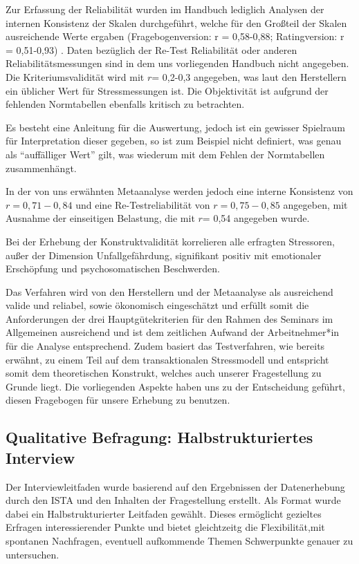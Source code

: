 \documentclass[12pt, a4paper]{article}
\begin{document}
Zur Erfassung der Reliabilität wurden im Handbuch lediglich Analysen der internen
Konsistenz der Skalen durchgeführt, welche für den Großteil der Skalen ausreichende Werte
ergaben (Fragebogenversion: r = 0,58-0,88; Ratingversion: r = 0,51-0,93) 
\parencite{semmerInstrumentZurStressbezogenen1999}. 
Daten bezüglich der Re-Test Reliabilität oder anderen Reliabilitätsmessungen sind in
dem uns vorliegenden Handbuch nicht angegeben. 
Die Kriteriumsvalidität wird mit $r$= 0,2-0,3
angegeben, was laut den Herstellern ein üblicher Wert für Stressmessungen ist.
Die Objektivität ist aufgrund der fehlenden Normtabellen ebenfalls kritisch zu betrachten. 

Es besteht eine Anleitung für die Auswertung, jedoch ist ein gewisser Spielraum für
Interpretation dieser gegeben, so ist zum Beispiel nicht definiert, was genau als “auffälliger
Wert” gilt, was wiederum mit dem Fehlen der Normtabellen zusammenhängt.

In der von uns erwähnten Metaanalyse werden jedoch eine interne Konsistenz von 
$r = 0,71-0,84$ und eine Re-Testreliabilität von $r =0,75-0,85$ angegeben, mit Ausnahme der
einseitigen Belastung, die mit $r$= 0,54 angegeben wurde.

Bei der Erhebung der Konstruktvalidität korrelieren alle erfragten Stressoren, außer der
Dimension Unfallgefährdung, signifikant positiv mit emotionaler Erschöpfung und
psychosomatischen Beschwerden.

Das Verfahren wird von den Herstellern und der Metaanalyse als ausreichend valide und
reliabel, sowie ökonomisch eingeschätzt und erfüllt somit die Anforderungen der drei
Hauptgütekriterien für den Rahmen des Seminars im Allgemeinen ausreichend und ist dem
zeitlichen Aufwand der Arbeitnehmer*in für die Analyse entsprechend. Zudem basiert das
Testverfahren, wie bereits erwähnt, zu einem Teil auf dem transaktionalen Stressmodell und
entspricht somit dem theoretischen Konstrukt, welches auch unserer Fragestellung zu
Grunde liegt. Die vorliegenden Aspekte haben uns zu der Entscheidung geführt, diesen
Fragebogen für unsere Erhebung zu benutzen.

\subsection{Qualitative Befragung: Halbstrukturiertes Interview}

Der Interviewleitfaden wurde basierend auf den Ergebnissen der Datenerhebung durch den 
ISTA und den Inhalten der Fragestellung erstellt. Als Format wurde dabei ein 
Halbstrukturierter Leitfaden gewählt. Dieses ermöglicht gezieltes Erfragen interessierender
Punkte und bietet gleichtzeitg die Flexibilität,mit spontanen Nachfragen, eventuell aufkommende Themen
Schwerpunkte genauer zu untersuchen. 
\end{document}
